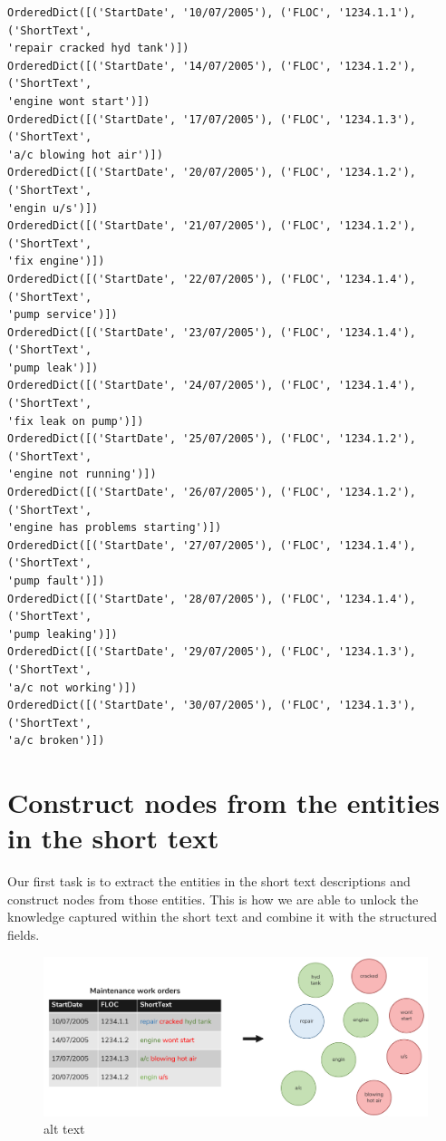 \documentclass[11pt]{article}
\begin{document}
    \begin{Verbatim}[commandchars=\\\{\}]
OrderedDict([('StartDate', '10/07/2005'), ('FLOC', '1234.1.1'), ('ShortText',
'repair cracked hyd tank')])
OrderedDict([('StartDate', '14/07/2005'), ('FLOC', '1234.1.2'), ('ShortText',
'engine wont start')])
OrderedDict([('StartDate', '17/07/2005'), ('FLOC', '1234.1.3'), ('ShortText',
'a/c blowing hot air')])
OrderedDict([('StartDate', '20/07/2005'), ('FLOC', '1234.1.2'), ('ShortText',
'engin u/s')])
OrderedDict([('StartDate', '21/07/2005'), ('FLOC', '1234.1.2'), ('ShortText',
'fix engine')])
OrderedDict([('StartDate', '22/07/2005'), ('FLOC', '1234.1.4'), ('ShortText',
'pump service')])
OrderedDict([('StartDate', '23/07/2005'), ('FLOC', '1234.1.4'), ('ShortText',
'pump leak')])
OrderedDict([('StartDate', '24/07/2005'), ('FLOC', '1234.1.4'), ('ShortText',
'fix leak on pump')])
OrderedDict([('StartDate', '25/07/2005'), ('FLOC', '1234.1.2'), ('ShortText',
'engine not running')])
OrderedDict([('StartDate', '26/07/2005'), ('FLOC', '1234.1.2'), ('ShortText',
'engine has problems starting')])
OrderedDict([('StartDate', '27/07/2005'), ('FLOC', '1234.1.4'), ('ShortText',
'pump fault')])
OrderedDict([('StartDate', '28/07/2005'), ('FLOC', '1234.1.4'), ('ShortText',
'pump leaking')])
OrderedDict([('StartDate', '29/07/2005'), ('FLOC', '1234.1.3'), ('ShortText',
'a/c not working')])
OrderedDict([('StartDate', '30/07/2005'), ('FLOC', '1234.1.3'), ('ShortText',
'a/c broken')])
    \end{Verbatim}

    \hypertarget{construct-nodes-from-the-entities-in-the-short-text}{%
\section{Construct nodes from the entities in the short
text}\label{construct-nodes-from-the-entities-in-the-short-text}}

Our first task is to extract the entities in the short text descriptions
and construct nodes from those entities. This is how we are able to
unlock the knowledge captured within the short text and combine it with
the structured fields.

\begin{figure}
\centering
\includegraphics{images/extracting-entities-v2.png}
\caption{alt text}
\end{figure}
\end{document}
